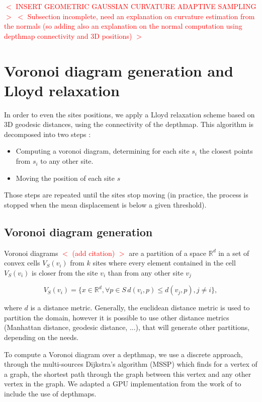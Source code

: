 \documentclass[11pt,fleqn]{book} %
\newcommand{\arnaud}[1]{\textcolor{red}{$<$ #1 $>$}}
\begin{document}
\arnaud{INSERT GEOMETRIC GAUSSIAN CURVATURE ADAPTIVE SAMPLING}
\arnaud{Subsection incomplete, need an explanation on curvature estimation from the normals (so adding also an explanation on the normal computation using depthmap connectivity and 3D positions)}

\section{Voronoi diagram generation and Lloyd relaxation}
\label{sec:lloyd_relaxation}

In order to even the sites positions, we apply a Lloyd relaxation scheme based on 3D geodesic distances, using the connectivity of the depthmap.
This algorithm is decomposed into two steps : 
\begin{itemize}
	\item Computing a voronoi diagram, determining for each site $s_i$ the closest points from $s_i$ to any other site.
	\item Moving the position of each site $s$
\end{itemize}

Those steps are repeated until the sites stop moving (in practice, the process is stopped when the mean displacement is below a given threshold).

\subsection{Voronoi diagram generation}
Voronoi diagrams \arnaud{(add citation)} are a partition of a space $\mathbb{R}^d$ in a set of convex cells $V_S(v_i)$ from $k$ sites where every element contained in the cell $V_S(v_i)$ is closer from the site $v_i$ than from any other site $v_j$

\begin{equation}
\label{eq:voronoi_cell}
	V_S(v_i) = \{ x \in \mathbb{R}^d, \forall p \in S\, d(v_i,p) \leq d(v_j,p), j \neq i\},
\end{equation}

where $d$ is a distance metric. Generally, the euclidean distance metric is used to partition the domain, however it is possible to use other distance metrics (Manhattan distance, geodesic distance, ...), that will generate other partitions, depending on the needs.

To compute a Voronoi diagram over a depthmap, we use a discrete approach, through the multi-sources Dijkstra's algorithm (MSSP) \cite{Dij59} which finds for a vertex of a graph, the shortest path through the graph between this vertex and any other vertex in the graph.
We adapted a GPU implementation from the work of \cite{PPA16} to include the use of depthmaps.
\end{document}
